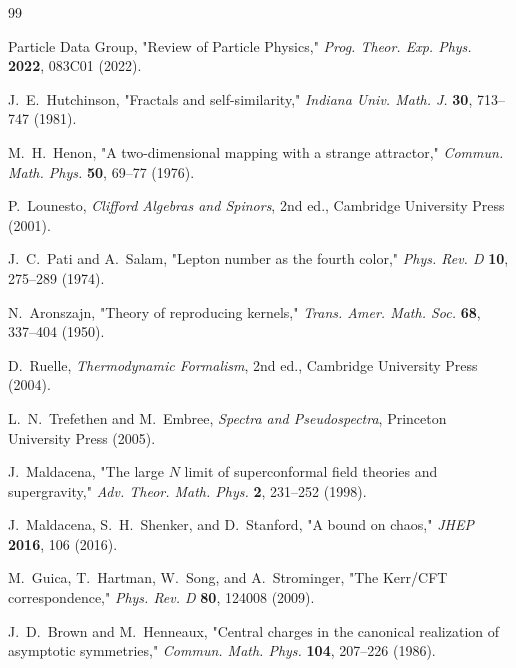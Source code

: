 \documentclass[12pt,a4paper]{ctexart}
\begin{document}
\begin{thebibliography}{99}

Particle Data Group, "Review of Particle Physics," 
\textit{Prog. Theor. Exp. Phys.} \textbf{2022}, 083C01 (2022).

J.~E.~Hutchinson, "Fractals and self-similarity," 
\textit{Indiana Univ. Math. J.} \textbf{30}, 713--747 (1981).

M.~H.~Henon, "A two-dimensional mapping with a strange attractor," 
\textit{Commun. Math. Phys.} \textbf{50}, 69--77 (1976).

P.~Lounesto, \textit{Clifford Algebras and Spinors}, 
2nd ed., Cambridge University Press (2001).

J.~C.~Pati and A.~Salam, "Lepton number as the fourth color," 
\textit{Phys. Rev. D} \textbf{10}, 275--289 (1974).

N.~Aronszajn, "Theory of reproducing kernels," 
\textit{Trans. Amer. Math. Soc.} \textbf{68}, 337--404 (1950).

D.~Ruelle, \textit{Thermodynamic Formalism}, 
2nd ed., Cambridge University Press (2004).

L.~N.~Trefethen and M.~Embree, 
\textit{Spectra and Pseudospectra}, Princeton University Press (2005).

J.~Maldacena, "The large $N$ limit of superconformal field theories and 
supergravity," \textit{Adv. Theor. Math. Phys.} \textbf{2}, 231--252 (1998).

J.~Maldacena, S.~H.~Shenker, and D.~Stanford, 
"A bound on chaos," \textit{JHEP} \textbf{2016}, 106 (2016).

M.~Guica, T.~Hartman, W.~Song, and A.~Strominger, 
"The Kerr/CFT correspondence," \textit{Phys. Rev. D} \textbf{80}, 124008 (2009).

J.~D.~Brown and M.~Henneaux, "Central charges in the canonical realization 
of asymptotic symmetries," \textit{Commun. Math. Phys.} \textbf{104}, 207--226 (1986).

\end{thebibliography}
\end{document}
